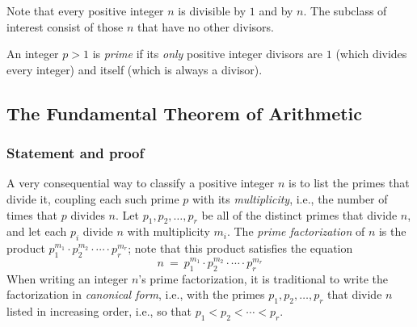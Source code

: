 Note that every positive integer $n$ is divisible by $1$ and by $n$.
The subclass of interest consist of those $n$ that have no other
divisors.

An integer $p >1$ is {\it prime}
if its {\em only} positive integer divisors are $1$ (which divides
every integer) and itself (which is always a divisor).
\bigskip

\noindent {}
  
\subsection{The Fundamental Theorem of Arithmetic}
\label{sec:Fund-Thm-Arith}

\subsubsection{Statement and proof}
\label{sec:FTA-basics}

A very consequential way to classify a positive integer $n$ is to list
the primes that divide it, coupling each such prime $p$ with its {\it
  multiplicity}, i.e., the number of times that $p$ divides $n$.  Let
$p_1, p_2, \ldots, p_r$ be all of the distinct primes that divide $n$,
and let each $p_i$ divide $n$ with multiplicity $m_i$.  The {\it prime
  factorization}   
of $n$ is the product $p_1^{m_1} \cdot p_2^{m_2} \cdot \cdots \cdot
p_r^{m_r}$; note that this product satisfies the equation
\begin{equation}
\label{eq:prime-factorization}
n \ = \ p_1^{m_1} \cdot p_2^{m_2} \cdot \cdots \cdot p_r^{m_r}
\end{equation}
When writing an integer $n$'s prime factorization, it is traditional
to write the factorization in {\it canonical form},
i.e., with the primes $p_1, p_2, \ldots, p_r$ that divide $n$ listed
in increasing order, i.e., so that $p_1 < p_2 < \cdots < p_r$.

